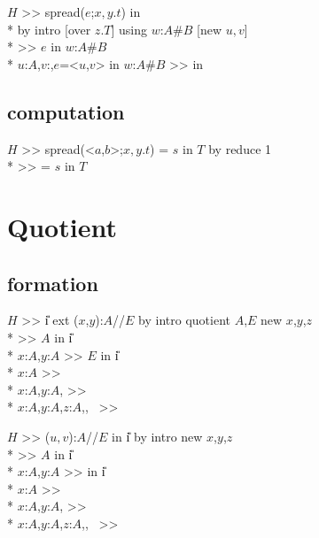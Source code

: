 \goalskip

\goal $H$ >> spread($e$;$x,y.t$) in  \\*
\continuegoal by intro [over $z.T$] using  $w$:$A$\#$B$ [new $u,v$] \\*
\subgoal >> $e$ in $w$:$A$\#$B$ \\*
\subgoal $u$:$A$,$v$:,$e$=<$u$,$v$> in $w$:$A$\#$B$ >>
             in 

\subsection*{computation}
\goal $H$ >> spread(<$a$,$b$>;$x,y.t$) = $s$ in $T$ by reduce 1 \\*
\subgoal >>  = $s$ in $T$

\par

\section{Quotient}
\subsection*{formation}
\goal $H$ >> \U{i} ext ($x$,$y$):$A$//$E$ by intro quotient $A$,$E$ new $x$,$y$,$z$ \\*
\subgoal >> $A$ in \U{i} \\*
\subgoal $x$:$A$,$y$:$A$ >> $E$ in \U{i} \\*	
\subgoal $x$:$A$ >>  \\*
\subgoal $x$:$A$,$y$:$A$,
          >>  \\*
\subgoal $x$:$A$,$y$:$A$,$z$:$A$,,\
           >> 


\goalskip

\goal $H$ >> ($u,v$):$A$//$E$ in \U{i} by intro new $x$,$y$,$z$\\*
\subgoal >> $A$ in \U{i} \\*
\subgoal $x$:$A$,$y$:$A$ >>  in \U{i} \\*
\subgoal $x$:$A$ >> \mysubst{$E$}{$u,v$}{$x,x$} \\*
\subgoal $x$:$A$,$y$:$A$,
          >>  \\*
\subgoal $x$:$A$,$y$:$A$,$z$:$A$,,\
           >> 

